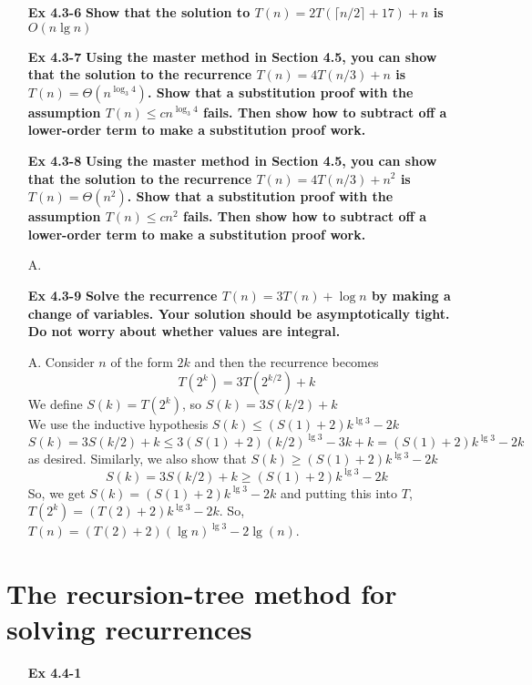 \documentclass[fontsize=12pt,paper=a4,open=any]{book}
\begin{document}
\begin{enumerate}
	\item[\textbf{Ex 4.3-6}]
		\textbf{Show that the solution to $T(n) = 2T(\lceil n/2 \rceil + 17) + n$ is $O(n \lg n)$}
		
	\item[\textbf{Ex 4.3-7}]
		\textbf{Using the master method in Section 4.5, you can show that the solution to the recurrence $T(n) = 4T(n/3)+n$ is $T(n) = \Theta(n^{\log_3 4})$. Show that a substitution proof with the assumption $T(n) \leq cn^{\log_3 4}$ fails. Then show how to subtract off a lower-order term to make a substitution proof work.}
		
	\item[\textbf{Ex 4.3-8}]
		\textbf{Using the master method in Section 4.5, you can show that the solution to the recurrence $T(n) = 4T(n/3)+n^2$ is $T(n) = \Theta(n^2)$. Show that a substitution
proof with the assumption $T(n) \leq cn^2$ fails. Then show how to subtract off a
lower-order term to make a substitution proof work.}
	\item[A.]
	

	\item[\textbf{Ex 4.3-9}]
		\textbf{Solve the recurrence $T(n) = 3T(n) + \log n$ by making a change of variables. Your solution should be asymptotically tight. Do not worry about whether values are integral.}
	\item[A.]
	Consider $n$ of the form $2k$ and then the recurrence becomes
	\[T(2^k) = 3T(2^{k/2}) + k\]
	We define $S(k) = T(2^k)$, so $S(k) = 3S(k/2) + k$ \\
	We use the inductive hypothesis $S(k) \leq (S(1)+2)k^{\lg 3} - 2k$
	\[ S(k) = 3S(k/2) + k \leq 3 (S(1) +2) (k/2)^{\lg 3} - 3k + k = (S(1) + 2)k^{\lg 3} - 2k \] 
	as desired. Similarly, we also show that $S(k) \geq (S(1) + 2)k^{\lg 3} - 2k$
	\[ S(k) = 3S(k/2) + k \geq (S(1) + 2)k^{\lg 3} - 2k\]
	So, we get $S(k) = (S(1) + 2)k^{\lg 3} - 2k$ and putting this into $T$, $T(2^k) = (T(2) + 2)k^{\lg 3} - 2k$. So, $T(n) = (T(2) + 2)(\lg n)^{\lg 3} - 2\lg(n)$.	
\end{enumerate}

\section{The recursion-tree method for solving recurrences}
\begin{enumerate}
	\item[\textbf{Ex 4.4-1}]
\end{enumerate}
\end{document}

